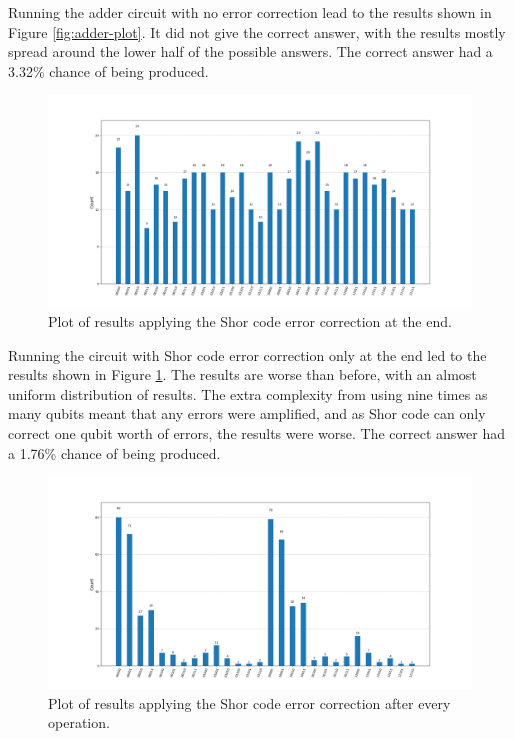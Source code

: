 \documentclass[letterpaper]{article}
\begin{document}
Running the adder circuit with no error correction lead to the results shown in Figure \ref{fig:adder-plot}. It did not give the correct answer, with the results mostly spread around the lower half of the possible answers. The correct answer had a 3.32\% chance of being produced.

\begin{figure}[H]
    \centering
    \includegraphics[width=\textwidth]{adder_corrected_end_plot}
    \caption{Plot of results applying the Shor code error correction at the end.}
    \label{fig:adder-corrected-end-plot}
\end{figure}

Running the circuit with Shor code error correction only at the end led to the results shown in Figure \ref{fig:adder-corrected-end-plot}. The results are worse than before, with an almost uniform distribution of results. The extra complexity from using nine times as many qubits meant that any errors were amplified, and as Shor code can only correct one qubit worth of errors, the results were worse. The correct answer had a 1.76\% chance of being produced.

\begin{figure}[H]
    \centering
    \includegraphics[width=\textwidth]{adder_corrected_all_gates_plot}
    \caption{Plot of results applying the Shor code error correction after every operation.}
    \label{fig:adder-corrected-all-gates-plot}
\end{figure}
\end{document}
